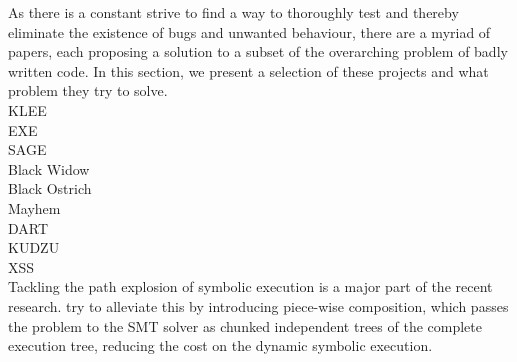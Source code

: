 

As there is a constant strive to find a way to thoroughly test and thereby eliminate the existence of bugs and unwanted behaviour, there are a myriad of papers, each proposing a solution to a subset of the overarching problem of badly written code.  In this section, we present a selection of these projects and what problem they try to solve.\\
KLEE \cite{cadar_klee_nodate}\\
EXE \cite{ball_deconstructing_nodate}\\
SAGE \cite{godefroid_sage_2012}\\
Black Widow \cite{eriksson_black_2021}\\
Black Ostrich \cite{eriksson_black_2023}\\
Mayhem \cite{cha_unleashing_2012}\\
DART  \cite{godefroid_random_2007}\\
KUDZU \cite{saxena_symbolic_2010}\\
\citet{kieyzun_automatic_2009} XSS\\



Tackling the path explosion of symbolic execution is a  major part of the recent research.
\citet{ryan_countering_nodate} try to alleviate this by introducing piece-wise composition, which passes the problem to the SMT solver as chunked independent trees of the complete execution tree, reducing the cost on the dynamic symbolic execution.